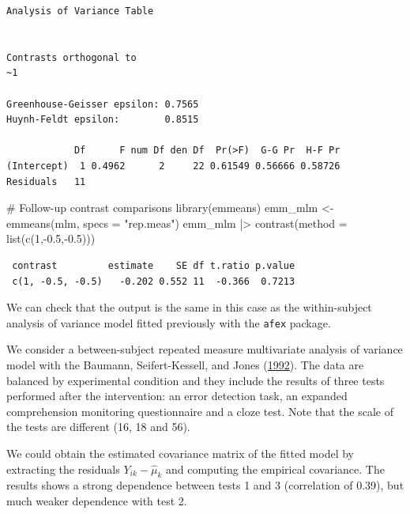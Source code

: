 \documentclass[
  11pt,
  letterpaper,
]{scrbook}
\newenvironment{Shaded}{\begin{snugshade}}{\end{snugshade}}
\newcommand{\AttributeTok}[1]{\textcolor[rgb]{0.40,0.45,0.13}{#1}}
\newcommand{\CommentTok}[1]{\textcolor[rgb]{0.37,0.37,0.37}{#1}}
\newcommand{\DecValTok}[1]{\textcolor[rgb]{0.68,0.00,0.00}{#1}}
\newcommand{\FloatTok}[1]{\textcolor[rgb]{0.68,0.00,0.00}{#1}}
\newcommand{\FunctionTok}[1]{\textcolor[rgb]{0.28,0.35,0.67}{#1}}
\newcommand{\NormalTok}[1]{\textcolor[rgb]{0.00,0.23,0.31}{#1}}
\newcommand{\OtherTok}[1]{\textcolor[rgb]{0.00,0.23,0.31}{#1}}
\newcommand{\SpecialCharTok}[1]{\textcolor[rgb]{0.37,0.37,0.37}{#1}}
\newcommand{\StringTok}[1]{\textcolor[rgb]{0.13,0.47,0.30}{#1}}
\theoremstyle{definition}
\theoremstyle{remark}
\begin{document}
\begin{verbatim}
Analysis of Variance Table


Contrasts orthogonal to
~1

Greenhouse-Geisser epsilon: 0.7565
Huynh-Feldt epsilon:        0.8515

            Df      F num Df den Df  Pr(>F)  G-G Pr  H-F Pr
(Intercept)  1 0.4962      2     22 0.61549 0.56666 0.58726
Residuals   11                                             
\end{verbatim}

\begin{Shaded}
\begin{Highlighting}[]
\CommentTok{\# Follow{-}up contrast comparisons}
\FunctionTok{library}\NormalTok{(emmeans)}
\NormalTok{emm\_mlm }\OtherTok{\textless{}{-}} \FunctionTok{emmeans}\NormalTok{(mlm, }\AttributeTok{specs =} \StringTok{"rep.meas"}\NormalTok{) }
\NormalTok{emm\_mlm }\SpecialCharTok{|\textgreater{}} \FunctionTok{contrast}\NormalTok{(}\AttributeTok{method =} \FunctionTok{list}\NormalTok{(}\FunctionTok{c}\NormalTok{(}\DecValTok{1}\NormalTok{,}\SpecialCharTok{{-}}\FloatTok{0.5}\NormalTok{,}\SpecialCharTok{{-}}\FloatTok{0.5}\NormalTok{)))}
\end{Highlighting}
\end{Shaded}

\begin{verbatim}
 contrast         estimate    SE df t.ratio p.value
 c(1, -0.5, -0.5)   -0.202 0.552 11  -0.366  0.7213
\end{verbatim}

We can check that the output is the same in this case as the
within-subject analysis of variance model fitted previously with the
\texttt{afex} package.

We consider a between-subject repeated measure multivariate analysis of
variance model with the Baumann, Seifert-Kessell, and Jones
(\protect\hyperlink{ref-Baumann:1992}{1992}). The data are balanced by
experimental condition and they include the results of three tests
performed after the intervention: an error detection task, an expanded
comprehension monitoring questionnaire and a cloze test. Note that the
scale of the tests are different (16, 18 and 56).

We could obtain the estimated covariance matrix of the fitted model by
extracting the residuals \(Y_{ik} - \widehat{\mu}_k\) and computing the
empirical covariance. The results shows a strong dependence between
tests 1 and 3 (correlation of 0.39), but much weaker dependence with
test 2.
\end{document}
